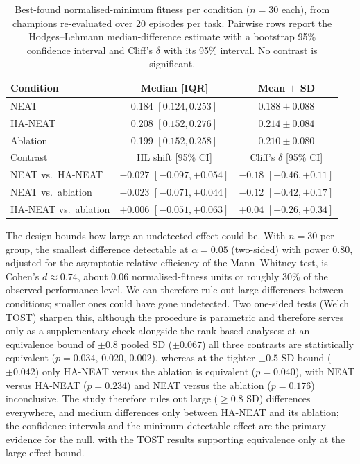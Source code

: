 \documentclass[12pt]{article}
\begin{document}
\begin{table}[h]
\centering
\caption{Best-found normalised-minimum fitness per condition ($n = 30$ each), from champions re-evaluated over 20 episodes per task. Pairwise rows report the Hodges--Lehmann median-difference estimate with a bootstrap 95\% confidence interval and Cliff's $\delta$ with its 95\% interval. No contrast is significant.}
\label{tab:main-fitness}
\begin{tabular}{lcc}
\toprule
Condition & Median [IQR] & Mean $\pm$ SD \\
\midrule
NEAT & 0.184 $[0.124, 0.253]$ & $0.188 \pm 0.088$ \\
HA-NEAT & 0.208 $[0.152, 0.276]$ & $0.214 \pm 0.084$ \\
Ablation & 0.199 $[0.152, 0.258]$ & $0.210 \pm 0.080$ \\
\midrule
Contrast & HL shift [95\% CI] & Cliff's $\delta$ [95\% CI] \\
\midrule
NEAT vs.\ HA-NEAT & $-0.027$ $[-0.097, +0.054]$ & $-0.18$ $[-0.46, +0.11]$ \\
NEAT vs.\ ablation & $-0.023$ $[-0.071, +0.044]$ & $-0.12$ $[-0.42, +0.17]$ \\
HA-NEAT vs.\ ablation & $+0.006$ $[-0.051, +0.063]$ & $+0.04$ $[-0.26, +0.34]$ \\
\bottomrule
\end{tabular}
\end{table}

The design bounds how large an undetected effect could be.
With $n = 30$ per group, the smallest difference detectable at $\alpha = 0.05$ (two-sided) with power 0.80, adjusted for the asymptotic relative efficiency of the Mann--Whitney test, is Cohen's $d \approx 0.74$, about 0.06 normalised-fitness units or roughly 30\% of the observed performance level.
We can therefore rule out large differences between conditions; smaller ones could have gone undetected.
Two one-sided tests (Welch TOST) sharpen this, although the procedure is parametric and therefore serves only as a supplementary check alongside the rank-based analyses: at an equivalence bound of $\pm 0.8$ pooled SD ($\pm 0.067$) all three contrasts are statistically equivalent ($p = 0.034$, $0.020$, $0.002$), whereas at the tighter $\pm 0.5$ SD bound ($\pm 0.042$) only HA-NEAT versus the ablation is equivalent ($p = 0.040$), with NEAT versus HA-NEAT ($p = 0.234$) and NEAT versus the ablation ($p = 0.176$) inconclusive.
The study therefore rules out large ($\geq 0.8$ SD) differences everywhere, and medium differences only between HA-NEAT and its ablation; the confidence intervals and the minimum detectable effect are the primary evidence for the null, with the TOST results supporting equivalence only at the large-effect bound.
\end{document}

